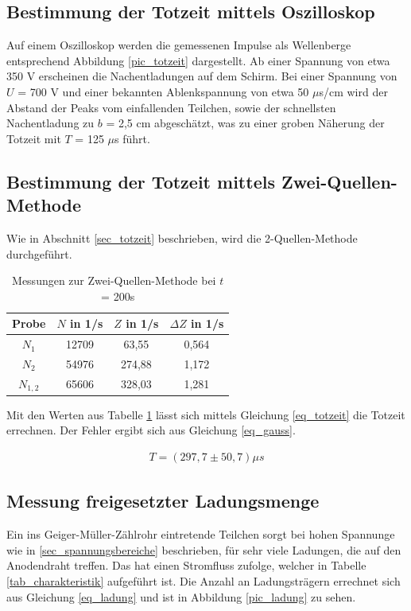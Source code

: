 \subsection{Bestimmung der Totzeit mittels Oszilloskop}
Auf einem Oszilloskop werden die gemessenen Impulse als Wellenberge entsprechend Abbildung \ref{pic_totzeit} dargestellt. Ab einer
Spannung von etwa 350 V erscheinen die Nachentladungen auf dem Schirm. Bei einer Spannung von $U$ = 700 V und einer bekannten
Ablenkspannung von etwa 50 $\mu$s/cm wird der Abstand der Peaks vom einfallenden Teilchen, sowie der schnellsten Nachentladung zu 
$b$ = 2,5 cm abgeschätzt, was zu einer groben Näherung der Totzeit mit $T$ = 125 $\mu$s führt.

\subsection{Bestimmung der Totzeit mittels Zwei-Quellen-Methode}
Wie in Abschnitt \ref{sec_totzeit} beschrieben, wird die 2-Quellen-Methode durchgeführt. 

\begin{table}[H]
 \begin{tabular}{c|c|c|c}
Probe & $N$ in 1/s & $Z$ in 1/s & $\Delta Z$ in 1/s \\
\hline
$N_1$		& 12709 	& 63,55 	& 0,564\\
$N_2$ 		& 54976 	& 274,88 	& 1,172\\
$N_{1,2}$ 	& 65606 	& 328,03	& 1,281
  
 \end{tabular}
\caption{Messungen zur Zwei-Quellen-Methode bei $t$ = 200s}
\label{tab_2quellen}
\end{table}

Mit den Werten aus Tabelle \ref{tab_2quellen} lässt sich mittels Gleichung \eqref{eq_totzeit} die Totzeit errechnen. Der Fehler ergibt
sich aus Gleichung \eqref{eq_gauss}.

\begin{align}
 T = (297,7 \pm 50,7) \mu s
\end{align}

\subsection{Messung freigesetzter Ladungsmenge}
Ein ins Geiger-Müller-Zählrohr eintretende Teilchen sorgt bei hohen Spannunge wie in \ref{sec_spannungsbereiche} beschrieben, für sehr
viele Ladungen, die auf den Anodendraht treffen. Das hat einen Stromfluss zufolge, welcher in Tabelle \ref{tab_charakteristik} 
aufgeführt ist. Die Anzahl an Ladungsträgern errechnet sich aus Gleichung \eqref{eq_ladung} und ist in Abbildung \ref{pic_ladung} zu
sehen.

